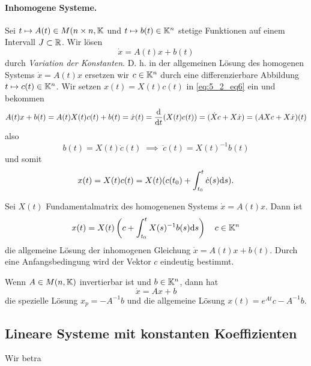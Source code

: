\paragraph{Inhomogene Systeme. } Sei $t \mapsto A(t) \in M(n\times n, \mathbb{K}$ und $t \mapsto b(t) \in \mathbb{K}^n$ stetige Funktionen auf einem Intervall $J \subset \mathbb{R}$. Wir lösen
\begin{equation}\label{eq:5_2_eq6}
	\dot{x} = A(t) x + b(t)
\end{equation}
durch \textit{Variation der Konstanten}. D. h. in der allgemeinen Lösung des homogenen Systems $\dot{x} = A(t) x$ ersetzen wir $c \in \mathbb{K}^n$ durch eine differenzierbare Abbildung $t \mapsto c(t) \in \mathbb{K}^n$. Wir setzen $x(t) = X(t) c(t)$ in \eqref{eq:5_2_eq6} ein und bekommen
\begin{align*}
	A(t) x + b(t) = A(t) X(t) c(t) + b(t) = \dot{x}(t) = \frac{\mathrm{d}}{\mathrm{d} t} (X(t) c(t)) = (\dot{X}c + X\dot{x}) = (AXc + X\dot{x}) (t)
\end{align*}
also
\[b(t) = X(t) \dot{c}(t) \;\implies\; \dot{c}(t) = X(t)^{-1} b(t)\]
und somit
\[x(t) = X(t)c(t) = X(t)(c(t_0) + \int_{t_0}^t \dot{c}(s) \mathrm{d} s).\]
\begin{satz}\label{satz5_5}
	Sei $X(t)$ Fundamentalmatrix des homogenenen Systems $\dot{x}=A(t)x$. Dann ist
	\begin{equation}\label{eq:5_2_eq7}
		x(t) = X(t) \left(c+\int_{t_0}^t X(s)^{-1}b(s) \mathrm{d} s\right) \quad c \in \mathbb{K}^n
	\end{equation}
	die allgemeine Lösung der inhomogenen Gleichung $\dot{x} = A(t)x + b(t)$. Durch eine Anfangsbedingung wird der Vektor $c$ eindeutig bestimmt.
\end{satz}
\begin{beispiel}
	Wenn $A \in M(n, \mathbb{K})$ invertierbar ist und $b \in \mathbb{K}^n$, dann hat
	\[\dot{x} = Ax + b\]
	die spezielle Lösung $x_p = -A^{-1} b$ und die allgemeine Lösung $x(t) = e^{At}c - A^{-1} b$.
\end{beispiel}
\subsection{Lineare Systeme mit konstanten Koeffizienten}
Wir betra